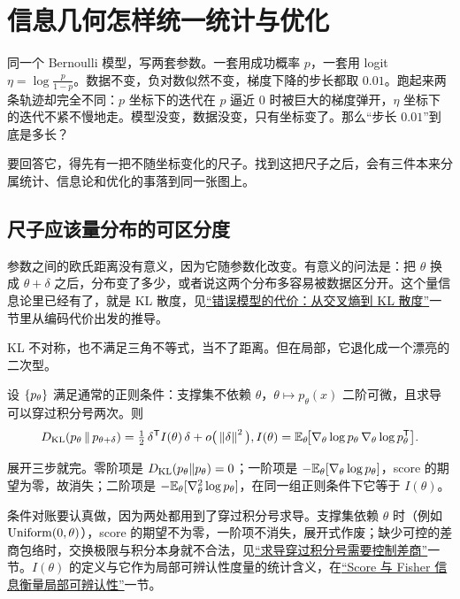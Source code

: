 \section{信息几何怎样统一统计与优化}
\label{sec:12-Real-Analysis-Support/10-Essential-Structures/03}

同一个 Bernoulli 模型，写两套参数。一套用成功概率 \(p\)，一套用 logit \(\eta=\log\frac{p}{1-p}\)。数据不变，负对数似然不变，梯度下降的步长都取 \(0.01\)。跑起来两条轨迹却完全不同：\(p\) 坐标下的迭代在 \(p\) 逼近 \(0\) 时被巨大的梯度弹开，\(\eta\) 坐标下的迭代不紧不慢地走。模型没变，数据没变，只有坐标变了。那么``步长 \(0.01\)''到底是多长？

要回答它，得先有一把不随坐标变化的尺子。找到这把尺子之后，会有三件本来分属统计、信息论和优化的事落到同一张图上。

\subsection{尺子应该量分布的可区分度}

参数之间的欧氏距离没有意义，因为它随参数化改变。有意义的问法是：把 \(\theta\) 换成 \(\theta+\delta\) 之后，分布变了多少，或者说这两个分布多容易被数据区分开。这个量信息论里已经有了，就是 KL 散度，见\hyperref[sec:07-Information-Theory/03-Divergences/01]{``错误模型的代价：从交叉熵到 KL 散度''}一节里从编码代价出发的推导。

KL 不对称，也不满足三角不等式，当不了距离。但在局部，它退化成一个漂亮的二次型。

\begin{theorem}
设 \(\left\{p_\theta\right\}\) 满足通常的正则条件：支撑集不依赖 \(\theta\)，\(\theta\mapsto p_\theta(x)\) 二阶可微，且求导可以穿过积分号两次。则
\[
D_{\mathrm{KL}}(p_\theta\,\|\,p_{\theta+\delta})
=\tfrac12\,\delta^{\mathsf{T}} I(\theta)\,\delta+o\big(\left\lVert\delta\right\rVert^2\big),
\space
I(\theta)=\mathbb{E}_\theta\!\big[\nabla_\theta\log p_\theta\,\nabla_\theta\log p_\theta^{\mathsf{T}}\big].
\]
\end{theorem}

展开三步就完。零阶项是 \(D_{\mathrm{KL}}(p_\theta\|p_\theta)=0\)；一阶项是 \(-\mathbb{E}_\theta[\nabla_\theta\log p_\theta]\)，score 的期望为零，故消失；二阶项是 \(-\mathbb{E}_\theta[\nabla^2_\theta\log p_\theta]\)，在同一组正则条件下它等于 \(I(\theta)\)。

条件对账要认真做，因为两处都用到了穿过积分号求导。支撑集依赖 \(\theta\) 时（例如 \(\operatorname{Uniform}(0,\theta)\)），score 的期望不为零，一阶项不消失，展开式作废；缺少可控的差商包络时，交换极限与积分本身就不合法，见\hyperref[sec:12-Real-Analysis-Support/04-Limits-and-Integration/03]{``求导穿过积分号需要控制差商''}一节。\(I(\theta)\) 的定义与它作为局部可辨认性度量的统计含义，在\hyperref[sec:11-Mathematical-Statistics/03-Sufficient-Statistics-and-Information/02]{``Score 与 Fisher 信息衡量局部可辨认性''}一节。

